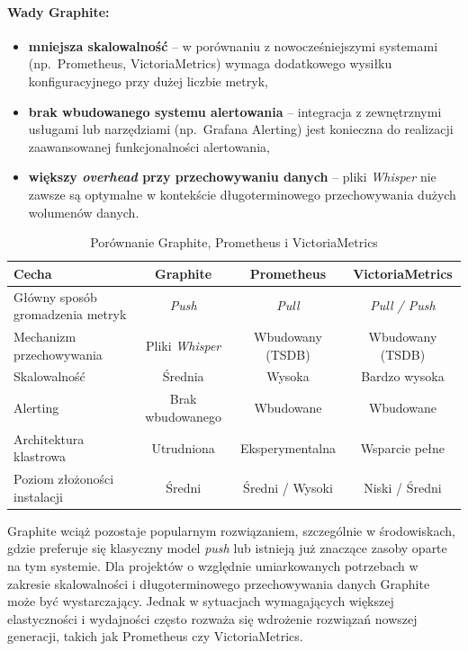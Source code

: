 \documentclass{article}
\begin{document}
\paragraph{Wady Graphite:}
\begin{itemize}
    \item \textbf{mniejsza skalowalność} -- w porównaniu z nowocześniejszymi systemami (np.\ Prometheus, VictoriaMetrics) wymaga dodatkowego wysiłku konfiguracyjnego przy dużej liczbie metryk,
    \item \textbf{brak wbudowanego systemu alertowania} -- integracja z zewnętrznymi usługami lub narzędziami (np.\ Grafana Alerting) jest konieczna do realizacji zaawansowanej funkcjonalności alertowania,
    \item \textbf{większy \emph{overhead} przy przechowywaniu danych} -- pliki \emph{Whisper} nie zawsze są optymalne w kontekście długoterminowego przechowywania dużych wolumenów danych.
\end{itemize}

\begin{table}[H]
    \centering
    \begin{tabular}{|l|c|c|c|}
        \hline
        \textbf{Cecha} & \textbf{Graphite} & \textbf{Prometheus} & \textbf{VictoriaMetrics} \\ \hline
        Główny sposób gromadzenia metryk & \emph{Push}         & \emph{Pull}          & \emph{Pull / Push}       \\ \hline
        Mechanizm przechowywania       & Pliki \emph{Whisper} & Wbudowany (TSDB)     & Wbudowany (TSDB)         \\ \hline
        Skalowalność                   & Średnia              & Wysoka               & Bardzo wysoka            \\ \hline
        Alerting                       & Brak wbudowanego      & Wbudowane            & Wbudowane                \\ \hline
        Architektura klastrowa         & Utrudniona           & Eksperymentalna      & Wsparcie pełne           \\ \hline
        Poziom złożoności instalacji   & Średni               & Średni / Wysoki      & Niski / Średni           \\ \hline
    \end{tabular}
    \caption{Porównanie Graphite, Prometheus i VictoriaMetrics}
    \label{tab:porownanie-graphite-prometheus-victoriametrics}
\end{table}

Graphite wciąż pozostaje popularnym rozwiązaniem, szczególnie w środowiskach, gdzie preferuje się klasyczny model \emph{push} lub istnieją już znaczące zasoby oparte na tym systemie. Dla projektów o względnie umiarkowanych potrzebach w zakresie skalowalności i długoterminowego przechowywania danych Graphite może być wystarczający. Jednak w sytuacjach wymagających większej elastyczności i wydajności często rozważa się wdrożenie rozwiązań nowszej generacji, takich jak Prometheus czy VictoriaMetrics.
\end{document}
